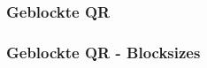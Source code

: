 \begin{frame}
	\frametitle{Geblockte QR}
		\frametitle{Geblockte QR - Blocksizes}
	\centering
\end{frame}




